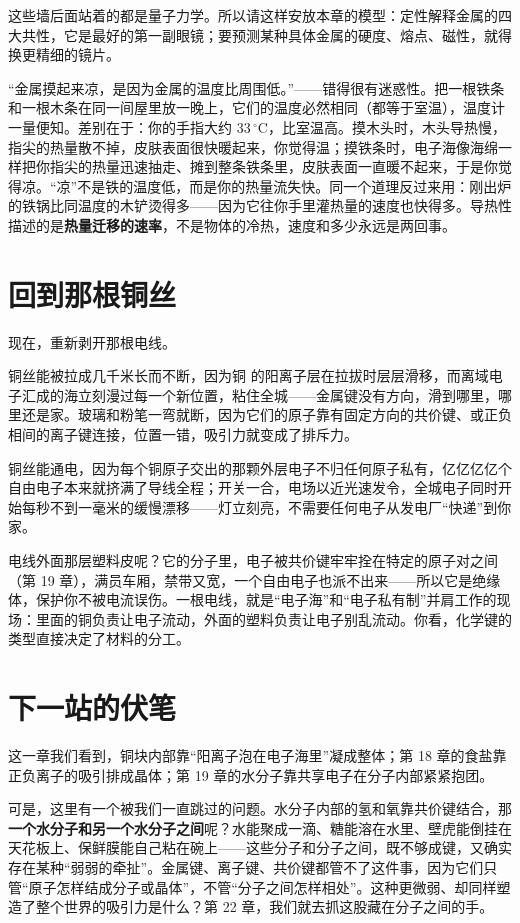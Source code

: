 这些墙后面站着的都是量子力学。所以请这样安放本章的模型：定性解释金属的四大共性，它是最好的第一副眼镜；要预测某种具体金属的硬度、熔点、磁性，就得换更精细的镜片。

\begin{wuqu}
“金属摸起来凉，是因为金属的温度比周围低。”——错得很有迷惑性。把一根铁条和一根木条在同一间屋里放一晚上，它们的温度必然相同（都等于室温），温度计一量便知。差别在于：你的手指大约 $33\,^{\circ}\mathrm{C}$，比室温高。摸木头时，木头导热慢，指尖的热量散不掉，皮肤表面很快暖起来，你觉得温；摸铁条时，电子海像海绵一样把你指尖的热量迅速抽走、摊到整条铁条里，皮肤表面一直暖不起来，于是你觉得凉。“凉”不是铁的温度低，而是你的热量流失快。同一个道理反过来用：刚出炉的铁锅比同温度的木铲烫得多——因为它往你手里灌热量的速度也快得多。导热性描述的是\textbf{热量迁移的速率}，不是物体的冷热，速度和多少永远是两回事。
\end{wuqu}

\section{回到那根铜丝}

现在，重新剥开那根电线。

铜丝能被拉成几千米长而不断，因为铜  的阳离子层在拉拔时层层滑移，而离域电子汇成的海立刻漫过每一个新位置，粘住全城——金属键没有方向，滑到哪里，哪里还是家。玻璃和粉笔一弯就断，因为它们的原子靠有固定方向的共价键、或正负相间的离子键连接，位置一错，吸引力就变成了排斥力。

铜丝能通电，因为每个铜原子交出的那颗外层电子不归任何原子私有，亿亿亿亿个自由电子本来就挤满了导线全程；开关一合，电场以近光速发令，全城电子同时开始每秒不到一毫米的缓慢漂移——灯立刻亮，不需要任何电子从发电厂“快递”到你家。

电线外面那层塑料皮呢？它的分子里，电子被共价键牢牢拴在特定的原子对之间（第 19 章），满员车厢，禁带又宽，一个自由电子也派不出来——所以它是绝缘体，保护你不被电流误伤。一根电线，就是“电子海”和“电子私有制”并肩工作的现场：里面的铜负责让电子流动，外面的塑料负责让电子别乱流动。你看，化学键的类型直接决定了材料的分工。

\section{下一站的伏笔}

这一章我们看到，铜块内部靠“阳离子泡在电子海里”凝成整体；第 18 章的食盐靠正负离子的吸引排成晶体；第 19 章的水分子靠共享电子在分子内部紧紧抱团。

可是，这里有一个被我们一直跳过的问题。水分子内部的氢和氧靠共价键结合，那\textbf{一个水分子和另一个水分子之间}呢？水能聚成一滴、糖能溶在水里、壁虎能倒挂在天花板上、保鲜膜能自己粘在碗上——这些分子和分子之间，既不够成键，又确实存在某种“弱弱的牵扯”。金属键、离子键、共价键都管不了这件事，因为它们只管“原子怎样结成分子或晶体”，不管“分子之间怎样相处”。这种更微弱、却同样塑造了整个世界的吸引力是什么？第 22 章，我们就去抓这股藏在分子之间的手。

